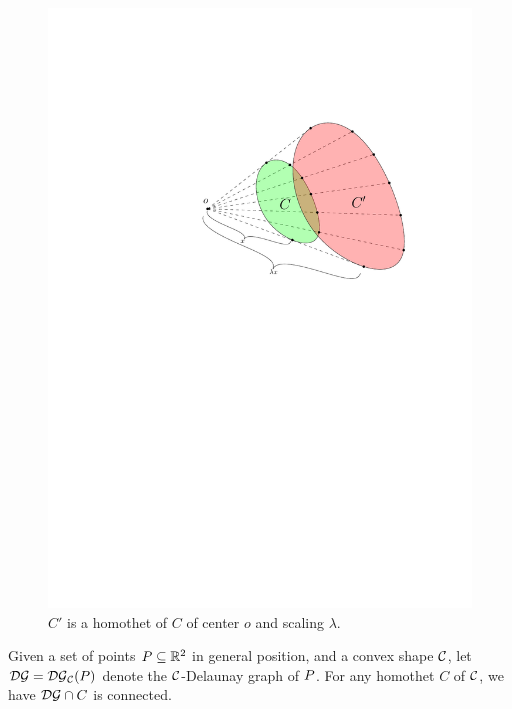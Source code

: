 \documentclass[12pt]{article}%
\begin{document}
\begin{figure}[h]
	\centering%
	\includegraphics{figs/homothet}%
	\caption{$C'$ is a homothet of $C$ of center $o$ and scaling $\lambda$.}
\end{figure}


\begin{claim}
	Given a set of points $P \subseteq \mathbb{R}^2$ in general position, and a convex shape $\mathcal{C}$, let $\mathcal{DG} = \mathcal{DG}_{\mathcal{C}}(P)$ denote the $\mathcal{C}$-Delaunay graph of $P$. For any homothet $C$ of $\mathcal{C}$, we have $\mathcal{DG} \cap {C}$ is connected.

\end{claim}
\end{document}
